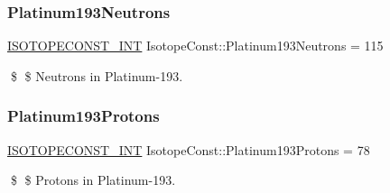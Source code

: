 \subsubsection{\texorpdfstring{Platinum193\+Neutrons}{Platinum193Neutrons}}
{\footnotesize\ttfamily \mbox{\hyperlink{group___isotope_const-_macros_ga5f18360b3e99483a35c32d789e62621c}{I\+S\+O\+T\+O\+P\+E\+C\+O\+N\+S\+T\+\_\+\+I\+NT}} Isotope\+Const\+::\+Platinum193\+Neutrons = 115}

\$ \$ Neutrons in Platinum-\/193. \mbox{\label{group___isotope_const-_platinum-_pt193_ga1f89c336e23ec93e49c1200ce5de73e8}} 
\subsubsection{\texorpdfstring{Platinum193\+Protons}{Platinum193Protons}}
{\footnotesize\ttfamily \mbox{\hyperlink{group___isotope_const-_macros_ga5f18360b3e99483a35c32d789e62621c}{I\+S\+O\+T\+O\+P\+E\+C\+O\+N\+S\+T\+\_\+\+I\+NT}} Isotope\+Const\+::\+Platinum193\+Protons = 78}

\$ \$ Protons in Platinum-\/193. 